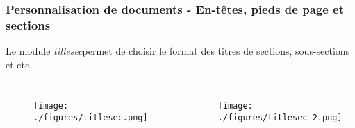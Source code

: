 \begin{frame}
    \frametitle{Personnalisation de documents - En-têtes, pieds de page et sections}
    Le module \textcolor{hard_green}{\textit{titlesec}}\footnotemark permet de choisir le format des titres de sections, sous-sections et etc.
    \begin{columns}
        \begin{figure}
           \centering
            \texttt{[image: ./figures/titlesec.png]}
            \label{fig: titlesec}
        \end{figure}
        \begin{figure}
           \centering
            \texttt{[image: ./figures/titlesec\_2.png]}
            \label{fig: titlesec_2}
        \end{figure}
    \end{columns}
\end{frame}
